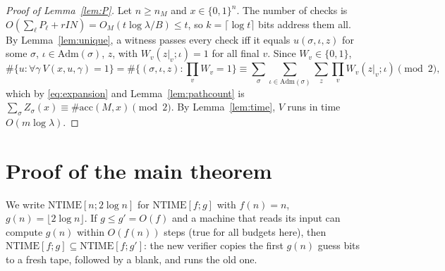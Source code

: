 \documentclass[11pt]{article}
\theoremstyle{definition}
\theoremstyle{remark}
\newcommand{\NTIME}{\mathrm{NTIME}}
\newcommand{\acc}{\#\mathrm{acc}}
\begin{document}
\begin{proof}[Proof of Lemma~\ref{lem:P}]
Let $n\ge n_M$ and $x\in\{0,1\}^n$. The number of checks is $O(\sum_\ell P_\ell+rIN)=O_M(t\log\lambda/B)\le t$, so $k=\lceil\log
t\rceil$ bits address them all. By Lemma~\ref{lem:unique}, a witness passes every check iff it equals $u(\sigma,\iota,z)$ for some
$\sigma$, $\iota\in\mathrm{Adm}(\sigma)$, $z$, with $W_v(z|_v;\iota)=1$ for all final $v$. Since $W_v\in\{0,1\}$,
\[
 \#\{u:\forall\gamma\ V(x,u,\gamma)=1\}=\#\{(\sigma,\iota,z):\textstyle\prod_vW_v=1\}
 \equiv\sum_\sigma\sum_{\iota\in\mathrm{Adm}(\sigma)}\sum_z\prod_vW_v(z|_v;\iota)\pmod2,
\]
which by \eqref{eq:expansion} and Lemma~\ref{lem:pathcount} is $\sum_\sigma Z_\sigma(x)\equiv\acc(M,x)\pmod2$. By
Lemma~\ref{lem:time}, $V$ runs in time $O(m\log\lambda)$.
\end{proof}

\section{Proof of the main theorem}\label{sec:wrapper}

We write $\NTIME[n;2\log n]$ for $\NTIME[f;g]$ with $f(n)=n$, $g(n)=\lfloor2\log n\rfloor$. If $g\le g'=O(f)$ and a machine that reads
its input can compute $g(n)$ within $O(f(n))$ steps (true for all budgets here), then $\NTIME[f;g]\subseteq\NTIME[f;g']$: the new verifier copies the first
$g(n)$ guess bits to a fresh tape, followed by a blank, and runs the old one.
\end{document}
